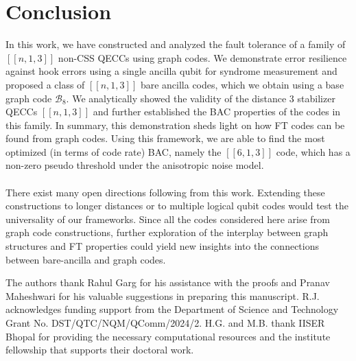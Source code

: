 \documentclass[reprint, amsmath,amssymb, aps,pra,
 floatfix,
]{revtex4-2}
\begin{document}
\section{Conclusion}
\label{sec:conclusion}

\noindent In this work, we have constructed and analyzed the fault tolerance of a family of $[[n,1,3]]$ non-CSS QECCs using graph codes. 
We demonstrate error resilience against hook errors using a single ancilla qubit for syndrome measurement and proposed a class of $[[n,1,3]]$ bare ancilla codes, which we obtain using a base graph code $\mathcal{B}_8$.
We analytically showed the validity of the distance $3$ stabilizer QECCs $[[n,1,3]]$ and further established the BAC properties of the codes in this family.
In summary, this demonstration sheds light on how FT codes can be found from graph codes.
Using this framework, we are able to find the most optimized (in terms of code rate) BAC, namely the $[[6,1,3]]$ code, which has a non-zero pseudo threshold under the anisotropic noise model.\\\\
There exist many open directions following from this work. 
Extending these constructions to longer distances or to multiple logical qubit codes would test the universality of our frameworks. 
Since all the codes considered here arise from graph code constructions, further exploration of the interplay between graph structures and FT properties could yield new insights into the connections between bare-ancilla and graph codes. 
\begin{acknowledgments}
\noindent The authors thank Rahul Garg for his assistance with the proofs and Pranav Maheshwari for his valuable suggestions in preparing this manuscript.
R.J. acknowledges funding support from the Department of Science and Technology Grant No. DST/QTC/NQM/QComm/2024/2. 
H.G. and M.B. thank IISER Bhopal for providing the necessary computational resources and the institute fellowship that supports their doctoral work.
\end{acknowledgments}

\newpage
\appendix
\end{document}
